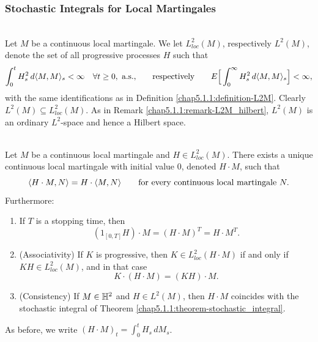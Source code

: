 \subsubsection{Stochastic Integrals for Local Martingales}

\begin{definition}\label{chap5.1.2:definition-L2loc}
\\
Let $M$ be a continuous local martingale. We let $L^2_{loc}(M)$, respectively $L^2(M)$, denote the set of all progressive processes $H$ such that
$$\int_0^t H_s^2\, d\langle M,M\rangle_s < \infty \quad \forall t\geq 0, \text{ a.s.,} \qquad\text{respectively}\qquad E\Big[\int_0^\infty H_s^2\, d\langle M,M\rangle_s\Big]<\infty,$$
with the same identifications as in Definition \ref{chap5.1.1:definition-L2M}. Clearly $L^2(M)\subseteq L^2_{loc}(M)$. As in Remark \ref{chap5.1.1:remark-L2M_hilbert}, $L^2(M)$ is an ordinary $L^2$-space and hence a Hilbert space.
\end{definition}

\begin{theorem}\label{chap5.1.2:theorem-stochastic_integral_local}
\\
Let $M$ be a continuous local martingale and $H\in L^2_{loc}(M)$. There exists a unique continuous local martingale with initial value $0$, denoted $H\cdot M$, such that
\begin{equation}\label{chap5.1.2:eq-bracket_commutes_local}
\langle H\cdot M, N\rangle = H\cdot \langle M,N\rangle \qquad \text{for every continuous local martingale } N.
\end{equation}
Furthermore:
\begin{enumerate}
    \item If $T$ is a stopping time, then
    \begin{equation}\label{chap5.1.2:eq-stopping_local}
        (1_{[0,T]}H)\cdot M = (H\cdot M)^T = H\cdot M^T.
    \end{equation}
    \item (Associativity) If $K$ is progressive, then $K\in L^2_{loc}(H\cdot M)$ if and only if $KH\in L^2_{loc}(M)$, and in that case
    \begin{equation}\label{chap5.1.2:eq-associativity_local}
        K\cdot(H\cdot M) = (KH)\cdot M.
    \end{equation}
    \item (Consistency) If $M\in\mathbb{H}^2$ and $H\in L^2(M)$, then $H\cdot M$ coincides with the stochastic integral of Theorem \ref{chap5.1.1:theorem-stochastic_integral}.
\end{enumerate}
As before, we write $(H\cdot M)_t=\int_0^t H_s\,dM_s$.
\end{theorem}

